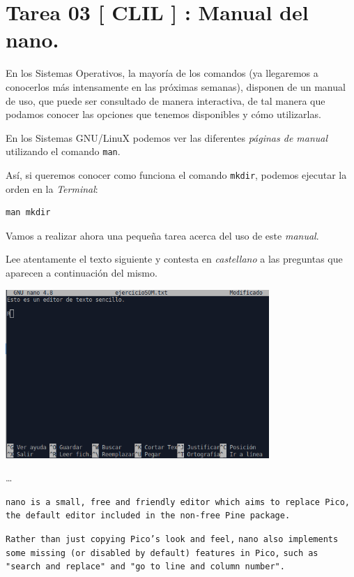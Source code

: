\documentclass[11pt]{article}
\begin{document}
\section{Tarea 03 [ CLIL ] : Manual del nano.}
\label{sec:org20d6bdc}

En los Sistemas Operativos, la mayoría de los comandos (ya llegaremos 
a conocerlos más intensamente en las próximas semanas), disponen de un 
manual de uso, que puede ser consultado de manera interactiva, de tal 
manera que podamos conocer las opciones que tenemos disponibles y cómo utilizarlas.

En los Sistemas GNU/LinuX podemos ver las diferentes \emph{páginas de manual} 
utilizando el comando \texttt{man}. 

Así, si queremos conocer como funciona el comando \texttt{mkdir}, podemos ejecutar 
la orden en la \emph{Terminal}:

\begin{verbatim}
man mkdir
\end{verbatim}

Vamos a realizar ahora una pequeña tarea acerca del uso de este \emph{manual}.

Lee atentamente el texto siguiente y contesta en \emph{castellano} a las 
preguntas que aparecen a continuación del mismo.


\begin{center}
\includegraphics[width=10cm]{./imgs/nano-ejemplo.png}
\end{center}

\ldots{}

\texttt{nano is a small, free and friendly editor which aims to replace Pico,} 
\texttt{the default editor included in the non-free Pine package.} 

\texttt{Rather than just copying Pico's look and feel,}
\texttt{nano also implements some missing (or disabled by default) features in Pico,} 
\texttt{such as "search and replace" and "go to line and column number".}
\end{document}
